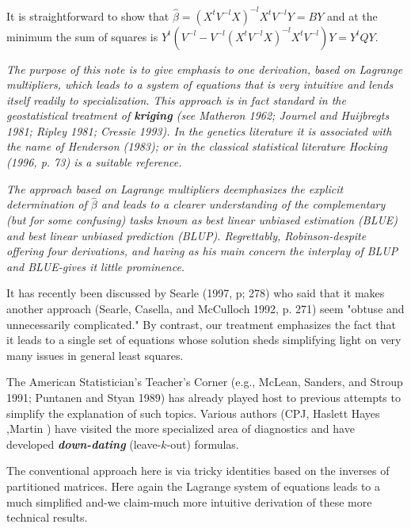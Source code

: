 \documentclass[12pt, a4paper]{article}
\begin{document}
It is straightforward to show that $\hat{\beta} = (X^tV^{-l}X)^{-l}X^tV^{-l}Y = BY$ and at the minimum the sum of squares is $Y^{t} (V^{-l}  - V^{-l}(X^tV^{-l}X)^{-l}X^tV^{-l})Y = Y^{t}QY$.\\
\bigskip

\emph{The purpose of this note is to give emphasis to one derivation, based on Lagrange multipliers, which leads to a system of equations that is very intuitive and lends itself readily to specialization. This approach is in fact standard in the geostatistical treatment of \textbf{kriging} (see Matheron 1962; Journel and Huijbregts 1981; Ripley 1981; Cressie 1993). In the genetics literature it is associated with the name of Henderson (1983); or in the classical statistical literature Hocking (1996, p. 73) is a suitable reference.}

\emph{The approach based on Lagrange multipliers deemphasizes the explicit determination of $\hat{\beta}$ and leads to a clearer understanding of the complementary (but for some confusing) tasks known as best linear unbiased estimation (BLUE) and best linear unbiased prediction (BLUP). Regrettably, Robinson-despite offering four derivations, and having as his main concern the interplay of BLUP and BLUE-gives it little prominence.}

It has recently been discussed by Searle (1997, p; 278) who said that it makes another approach (Searle, Casella, and McCulloch 1992, p. 271) seem "obtuse and unnecessarily complicated." By contrast, our treatment emphasizes the fact that it leads to a single set of equations whose solution sheds simplifying light on very many issues in general least squares.

The American Statistician's Teacher's Corner (e.g., McLean, Sanders, and Stroup 1991; Puntanen and Styan 1989) has already played host to previous attempts to simplify the explanation of such topics. Various authors (CPJ, Haslett Hayes ,Martin ) have visited the more specialized area of diagnostics and have developed \textbf{\emph{down-dating}} (leave-$k$-out) formulas.

The conventional approach here is via tricky identities based on the inverses of partitioned matrices. Here again the Lagrange system of equations leads to a much simplified and-we claim-much more intuitive derivation of these more technical results.
\end{document}
